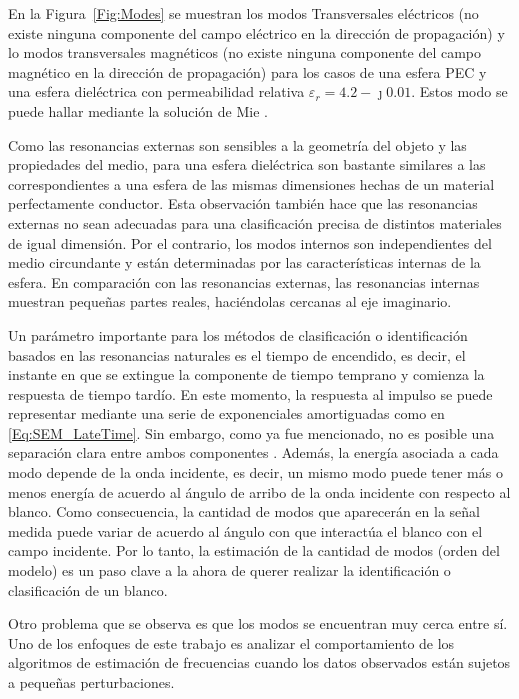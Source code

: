 En la Figura~\ref{Fig:Modes} se muestran los modos Transversales eléctricos (no existe ninguna componente del campo eléctrico en la dirección de propagación) y lo modos transversales magnéticos (no existe ninguna componente del campo magnético en la dirección de propagación) para los casos de una esfera PEC y una esfera dieléctrica con permeabilidad relativa $\varepsilon_r = 4.2-\jmath 0.01$. Estos modo se puede hallar mediante la solución de Mie \cite{Stratton1941}.

Como las resonancias externas son sensibles a la geometría del objeto y las propiedades del medio, para una esfera dieléctrica son bastante similares a las correspondientes a una esfera de las mismas dimensiones hechas de un material perfectamente conductor. Esta observación también hace que las resonancias externas no sean adecuadas para una clasificación precisa de distintos materiales de igual dimensión. Por el contrario, los modos internos son independientes del medio circundante y están determinadas por las características internas de la esfera. En comparación con las resonancias externas, las resonancias internas muestran pequeñas partes reales, haciéndolas cercanas al eje imaginario.

Un parámetro importante para los métodos de clasificación o identificación basados en las resonancias naturales es el tiempo de encendido, es decir, el instante en que se extingue la componente de tiempo temprano y comienza la respuesta de tiempo tardío. En este momento, la respuesta al impulso se puede representar mediante una serie de exponenciales amortiguadas como en \eqref{Eq:SEM_LateTime}. Sin embargo, como ya fue mencionado, no es posible una separación clara entre ambos componentes \cite{Pearson1982}. Además, la energía asociada a cada modo depende de la onda incidente, es decir, un mismo modo puede tener más o menos energía de acuerdo al ángulo de arribo de la onda incidente con respecto al blanco. Como consecuencia, la cantidad de modos que aparecerán en la señal medida puede variar de acuerdo al ángulo con que interactúa el blanco con el campo incidente. Por lo tanto, la estimación de la cantidad de modos (orden del modelo) es un paso clave a la ahora de querer realizar la identificación o clasificación de un blanco. 

Otro problema que se observa es que los modos se encuentran muy cerca entre sí. Uno de los enfoques de este trabajo es analizar el comportamiento de los algoritmos de estimación de frecuencias cuando los datos observados están sujetos a pequeñas perturbaciones. 


